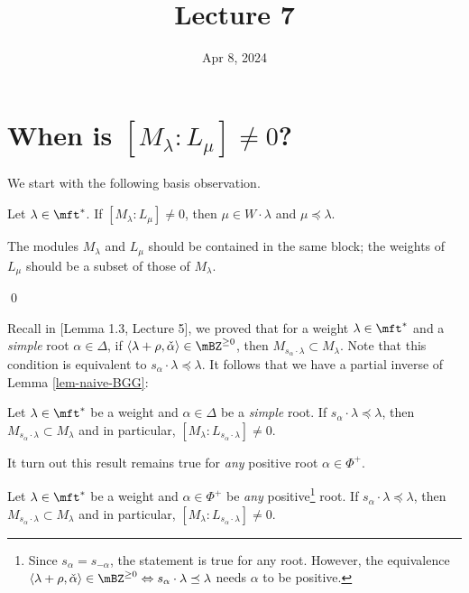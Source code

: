





\title{Lecture 7}

\date{Apr 8, 2024}

\maketitle

\section{When is \texorpdfstring{$[M_\lambda:L_\mu]\neq0$}{[M:L] nonzero}?}

We start with the following basis observation.

\begin{lem}
	\label{lem-naive-BGG}
	Let $\lambda\in \mft^*$. If $[M_\lambda:L_\mu]\neq0$, then $\mu\in W\cdot \lambda$ and $\mu\preceq \lambda$.
\end{lem}

\proof
	The modules $M_\lambda$ and $L_\mu$ should be contained in the same block; the weights of $L_\mu$ should be a subset of those of $M_\lambda$.

\qed

	Recall in [Lemma 1.3, Lecture 5], we proved that for a weight $\lambda\in \mft^*$ and a \emph{simple} root $\alpha\in \Delta$, if $\langle \lambda+\rho,\check \alpha\rangle \in \mBZ^{\ge 0}$, then $M_{s_\alpha\cdot \lambda} \subset M_\lambda$. Note that this condition is equivalent to $s_\alpha \cdot \lambda \preceq \lambda$. It follows that we have a partial inverse of Lemma \ref{lem-naive-BGG}:

\begin{lem}
	\label{lem-Verma-weak}
	Let $\lambda\in \mft^*$ be a weight and $\alpha\in \Delta$ be a \emph{simple} root. If $s_\alpha \cdot \lambda \preceq \lambda$, then $M_{s_\alpha\cdot \lambda} \subset M_\lambda$ and in particular, $[M_{\lambda}:L_{s_\alpha\cdot \lambda}] \neq 0$.
\end{lem}

It turn out this result remains true for \emph{any} positive root $\alpha\in \Phi^+$.

\begin{thm}[Verma]
	\label{thm-Verma}
	Let $\lambda\in \mft^*$ be a weight and $\alpha\in \Phi^+$ be \emph{any} positive\footnote{Since $s_\alpha=s_{-\alpha}$, the statement is true for any root. However, the equivalence $\langle \lambda+\rho,\check \alpha\rangle \in \mBZ^{\ge 0} \Leftrightarrow s_\alpha \cdot \lambda \preceq \lambda$ needs $\alpha$ to be positive.} root. If $s_\alpha \cdot \lambda \preceq \lambda$, then $M_{s_\alpha\cdot \lambda} \subset M_\lambda$ and in particular, $[M_{\lambda}:L_{s_\alpha\cdot \lambda}] \neq 0$.
\end{thm}

